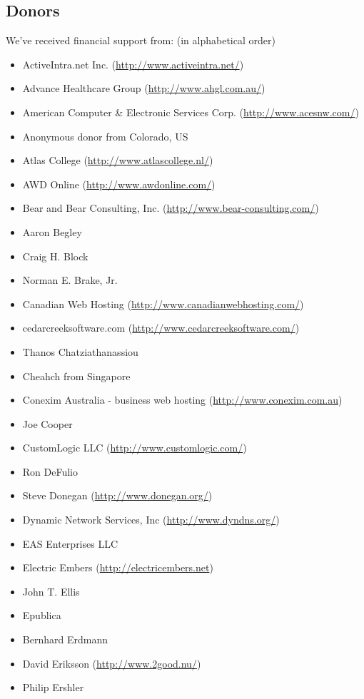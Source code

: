 \documentclass[a4paper,titlepage,12pt]{article}
\begin{document}
    \subsection{Donors}
    We've received financial support from: (in alphabetical order)
    \begin{itemize}
	\item ActiveIntra.net Inc. (\url{http://www.activeintra.net/})
	\item Advance Healthcare Group (\url{http://www.ahgl.com.au/})
	\item American Computer \& Electronic Services Corp. (\url{http://www.acesnw.com/})
	\item Anonymous donor from Colorado, US
	\item Atlas College (\url{http://www.atlascollege.nl/})
	\item AWD Online (\url{http://www.awdonline.com/})
	\item Bear and Bear Consulting, Inc. (\url{http://www.bear-consulting.com/})
	\item Aaron Begley
	\item Craig H. Block
	\item Norman E. Brake, Jr.
	\item Canadian Web Hosting (\url{http://www.canadianwebhosting.com/})
	\item cedarcreeksoftware.com (\url{http://www.cedarcreeksoftware.com/})
	\item Thanos Chatziathanassiou
	\item Cheahch from Singapore
	\item Conexim Australia - business web hosting (\url{http://www.conexim.com.au})
	\item Joe Cooper
	\item CustomLogic LLC (\url{http://www.customlogic.com/})
	\item Ron DeFulio
	\item Steve Donegan (\url{http://www.donegan.org/})
	\item Dynamic Network Services, Inc (\url{http://www.dyndns.org/})
	\item EAS Enterprises LLC
	\item Electric Embers (\url{http://electricembers.net})
	\item John T. Ellis
	\item Epublica
	\item Bernhard Erdmann
	\item David Eriksson (\url{http://www.2good.nu/})
	\item Philip Ershler

\end{itemize}
\end{document}
